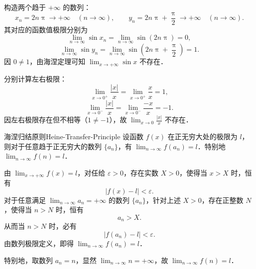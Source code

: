 \begin{myproof}

    构造两个趋于 $+\infty$ 的数列：
    \begin{equation}
        x_n = 2n\uppi \to +\infty \quad (n \to \infty), \qquad y_n = 2n\uppi + \frac{\uppi}{2} \to +\infty \quad (n \to \infty).
    \end{equation}
    其对应的函数值极限分别为
    \begin{equation}
        \lim_{n\to\infty} \sin x_n = \lim_{n\to\infty} \sin(2n\uppi) = 0,
    \end{equation}
    \begin{equation}
        \lim_{n\to\infty} \sin y_n = \lim_{n\to\infty} \sin\left(2n\uppi + \frac{\uppi}{2}\right) = 1.
    \end{equation}
    因 $0 \neq 1$，由海涅定理可知 $\lim_{x\to +\infty} \sin x$ 不存在．


    分别计算左右极限：
    \begin{equation}
        \lim_{x\to 0^+} \frac{|x|}{x} = \lim_{x\to 0^+} \frac{x}{x} = 1,
    \end{equation}
    \begin{equation}
        \lim_{x\to 0^-} \frac{|x|}{x} = \lim_{x\to 0^-} \frac{-x}{x} = -1.
    \end{equation}
    因左右极限存在但不相等（$1 \neq -1$），故 $\lim_{x\to 0} \frac{|x|}{x}$ 不存在．
\end{myproof}

\begin{problem}{海涅归结原则}{Heine-Transfer-Principle}
    设函数 $f(x)$ 在正无穷大处的极限为 $l$，则对于任意趋于正无穷大的数列 $\{a_n\}$，有 $\lim_{n\to\infty} f(a_n) = l$．特别地 $\lim_{n\to\infty} f(n) = l$．
\end{problem}

\begin{myproof}
    由 $\lim_{x\to +\infty} f(x) = l$，对任给 $\varepsilon > 0$，存在实数 $X > 0$，使得当 $x > X$ 时，恒有
    \begin{equation}
        |f(x) - l| < \varepsilon.
    \end{equation}
    对于任意满足 $\lim_{n\to\infty} a_n = +\infty$ 的数列 $\{a_n\}$，针对上述 $X > 0$，存在正整数 $N$，使得当 $n > N$ 时，恒有
    \begin{equation}
        a_n > X.
    \end{equation}
    从而当 $n > N$ 时，必有
    \begin{equation}
        |f(a_n) - l| < \varepsilon.
    \end{equation}
    由数列极限定义，即得 $\lim_{n\to\infty} f(a_n) = l$．

    特别地，取数列 $a_n = n$，显然 $\lim_{n\to\infty} n = +\infty$，故 $\lim_{n\to\infty} f(n) = l$．
\end{myproof}


